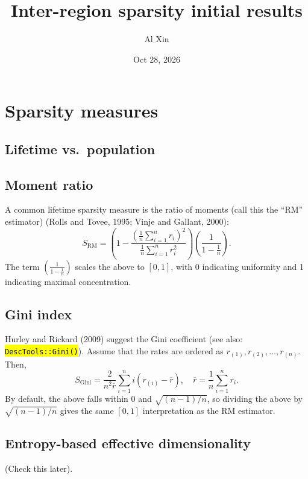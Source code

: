 \documentclass[
  11pt,
  letterpaper,
  DIV=11,
  numbers=noendperiod]{scrartcl}
\title{Inter-region sparsity initial results}
\author{Al Xin}
\date{Oct 28, 2026}
\let\OldTexttt\texttt
\renewcommand{\texttt}[1]{\OldTexttt{\hl{#1}}}
\begin{document}
\maketitle


\section{Sparsity measures}\label{sparsity-measures}

\subsection{Lifetime vs.~population}\label{lifetime-vs.-population}

\subsection{Moment ratio}\label{moment-ratio}

A common lifetime sparsity measure is the ratio of moments (call this
the ``RM'' estimator) (Rolls and Tovee, 1995; Vinje and Gallant, 2000):
\[
S_{\textrm{RM}} = \left( 1 - \frac{\left( \frac{1}{n} \sum_{i = 1}^n r_i \right)^2}{\frac{1}{n} \sum_{i = 1}^n r_i^2} \right) \left( \frac{1}{1 - \frac{1}{n}} \right).
\] The term \(\left( \frac{1}{1 - \frac{1}{n}} \right)\) scales the
above to \([0, 1]\), with 0 indicating uniformity and 1 indicating
maximal concentration.

\subsection{Gini index}\label{gini-index}

Hurley and Rickard (2009) suggest the Gini coefficient (see also:
\texttt{DescTools::Gini()}). Assume that the rates are ordered as
\(r_{(1)}, r_{(2)}, \dots, r_{(n)}\). Then, \[
S_{\textrm{Gini}} = 
\frac{2}{n^2 \overline{r}}
\sum_{i = 1}^n i (r_{(i)} - \overline{r}), \quad \overline{r} = \frac{1}{n} \sum_{i = 1}^{n} r_i.
\] By default, the above falls within 0 and \(\sqrt{(n - 1) / n}\), so
dividing the above by \(\sqrt{(n - 1) / n}\) gives the same \([0, 1]\)
interpretation as the RM estimator.

\subsection{Entropy-based effective
dimensionality}\label{entropy-based-effective-dimensionality}

(Check this later).
\end{document}
